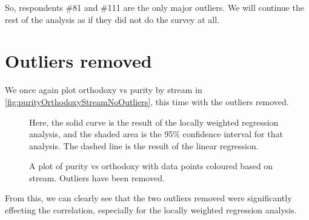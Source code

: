 So, respondents \#81 and \#111 are the only major outliers.
We will continue the rest of the analysis as if they did not do the survey at all.

\section{Outliers removed}
We once again plot orthodoxy vs purity by stream in \vref{fig:purityOrthodoxyStreamNoOutliers}, this time with the outliers removed.
\begin{figure}[H]
	\caption{A plot of purity vs orthodoxy with data points coloured based on stream. Outliers have been removed.}
	\label{fig:purityOrthodoxyStreamNoOutliers}
	Here, the solid curve is the result of the locally weighted regression analysis, and the shaded area is the 95\% confidence interval for that analysis.
	The dashed line is the result of the linear regression.
\end{figure}

From this, we can clearly see that the two outliers removed were significantly effecting the correlation, especially for the locally weighted regression analysis.
